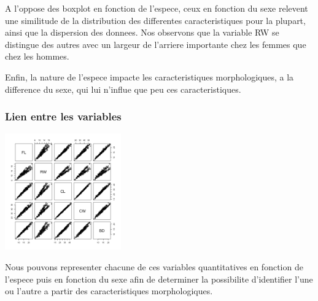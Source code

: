 \documentclass[]{report}
\begin{document}
A l'oppose des boxplot en fonction de l'espece, ceux en fonction du sexe relevent une similitude de la distribution des differentes caracteristiques pour la plupart, ainsi que la dispersion des donnees. Nos observons que la variable RW se distingue des autres avec un largeur de l'arriere importante chez les femmes que chez les hommes.

Enfin, la nature de l'espece impacte les caracteristiques morphologiques, a la difference du sexe, qui lui n'influe que peu ces caracteristiques.
\subsubsection{Lien entre les variables}
\begin{center}
	\includegraphics[width=50mm]{Figures/Crabs/plot_crabsquant.png}
	\label{fig:multiplot_crabs}
\end{center}

Nous pouvons representer chacune de ces variables quantitatives en fonction de l'espece puis en fonction du sexe afin de determiner la possibilite d'identifier l'une ou l'autre a partir des caracteristiques morphologiques. \\
\end{document}
